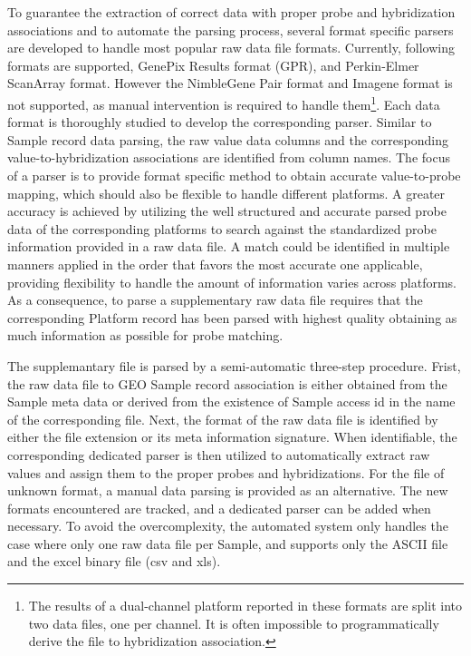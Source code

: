 To guarantee the extraction of correct data with proper probe and
hybridization associations and to automate the parsing process, several
format specific parsers are developed to handle most popular raw data file
formats.
%
Currently, following formats are supported, GenePix Results format (GPR),
and Perkin-Elmer ScanArray format.  
However the NimbleGene Pair format and Imagene format is not supported, as
manual intervention is required to handle them\footnote{The results of a
  dual-channel platform reported in these formats are split into two data
  files, one per channel.  It is often impossible to programmatically derive
  the file to hybridization association.}.
%
Each data format is thoroughly studied to develop the corresponding parser.
Similar to Sample record data parsing, the raw value data columns and the
corresponding value-to-hybridization associations are identified from column
names.
%
The focus of a parser is to provide format specific method to obtain accurate
value-to-probe mapping, which should also be flexible to handle different
platforms.
%
A greater accuracy is achieved by utilizing the well structured and accurate
parsed probe data of the corresponding platforms to search against the
standardized probe information provided in a raw data file.
%
A match could be identified in multiple manners applied in the order that
favors the most accurate one applicable, providing flexibility to handle the
amount of information varies across platforms.
%
As a consequence, to parse a supplementary raw data file requires that the
corresponding Platform record has been parsed with highest quality obtaining
as much information as possible for probe matching.


The supplemantary file is parsed by a semi-automatic three-step procedure.
%
Frist, the raw data file to GEO Sample record association is either obtained
from the Sample meta data or derived from the existence of Sample access id
in the name of the corresponding file.
%
Next, the format of the raw data file is identified by either the file
extension or its meta information signature.
%
When identifiable, the corresponding dedicated parser is then utilized to
automatically extract raw values and assign them to the proper probes and
hybridizations.
%
For the file of unknown format, a manual data parsing is provided as an
alternative.
%
The new formats encountered are tracked, and a dedicated parser can be added
when necessary.
%
%
To avoid the overcomplexity, the automated system only handles the case where
only one raw data file per Sample, and supports only the ASCII file and the
excel binary file (csv and xls).

